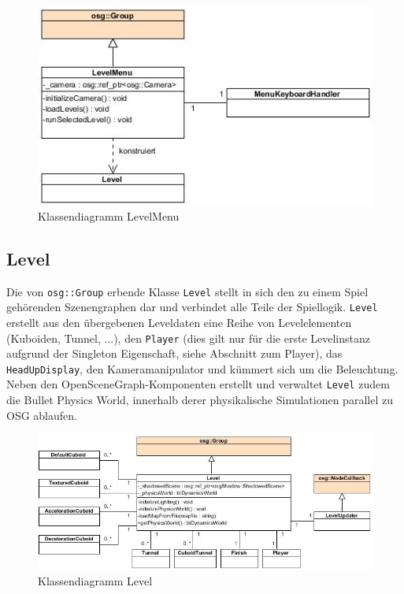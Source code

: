\documentclass{llncs}
\begin{document}
\begin{figure}[H]
	\centering
	\includegraphics[width=1\textwidth]{LevelMenu.jpg}
	\caption{Klassendiagramm LevelMenu}
\end{figure}

\subsection{Level}
Die von \texttt{osg::Group} erbende Klasse \texttt{Level} stellt in sich den zu einem Spiel geh\"orenden Szenengraphen
dar und verbindet alle Teile der Spiellogik. \texttt{Level} erstellt aus den \"ubergebenen Leveldaten eine Reihe
von Levelelementen (Kuboiden, Tunnel, ...), den \texttt{Player} (dies gilt nur f\"ur die erste Levelinstanz aufgrund der Singleton Eigenschaft, siehe Abschnitt zum Player),
das \texttt{HeadUpDisplay}, den Kameramanipulator und k\"ummert sich um die Beleuchtung.\\
Neben den OpenSceneGraph-Komponenten erstellt und verwaltet \texttt{Level} zudem die Bullet Physics World, innerhalb
derer physikalische Simulationen parallel zu OSG ablaufen.\\

\begin{figure}[H]
	\centering
	\includegraphics[width=1\textwidth]{Level.jpg}
	\caption{Klassendiagramm Level}
\end{figure}
\end{document}
